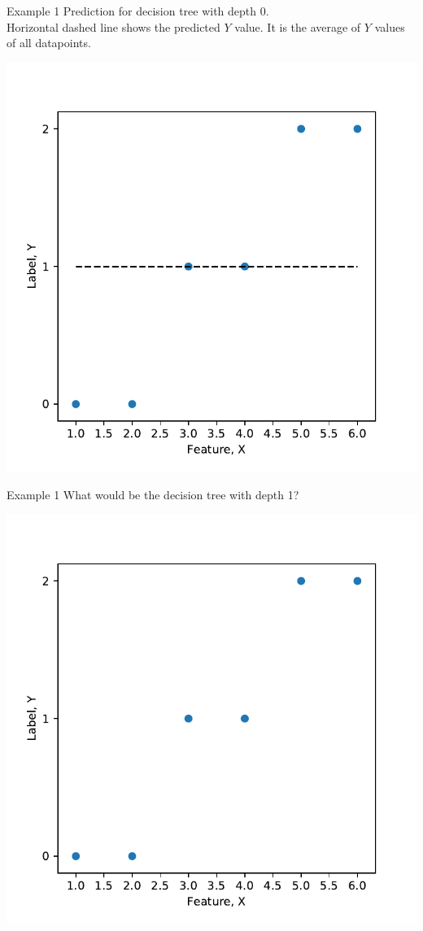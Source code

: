 \documentclass{beamer}
\begin{document}
\begin{frame}{Example 1}
Prediction for decision tree with depth 0.\\
Horizontal dashed line shows the predicted $Y$ value. It is the average of $Y$ values of all datapoints.\\
\begin{center}
\includegraphics[scale=0.5]{decision-trees-regression/imgs/depth-0-boundary}	
\end{center}
\end{frame}


\begin{frame}{Example 1}
What would be the decision tree with depth 1?
\begin{center}
\includegraphics[scale=0.5]{decision-trees-regression/imgs/dataset}
\end{center}
\end{frame}
\end{document}
